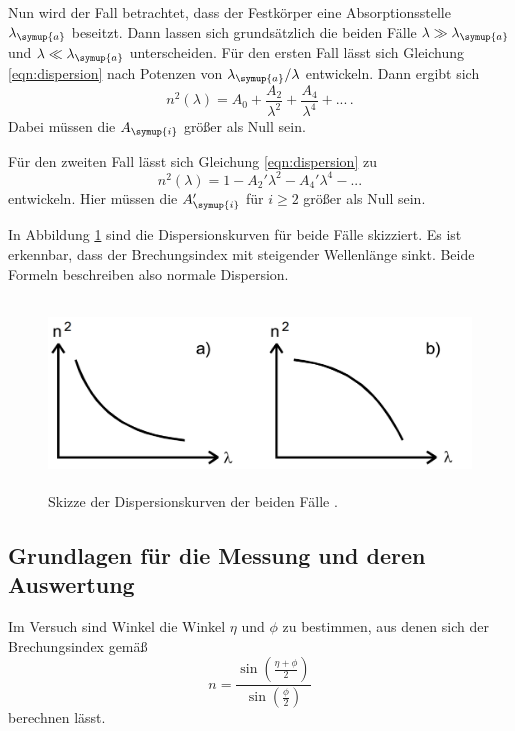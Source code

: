 Nun wird der Fall betrachtet, dass der Festkörper eine Absorptionsstelle
$\lambda_{\symup{a}}$ beseitzt. Dann lassen sich grundsätzlich die beiden Fälle
$\lambda \gg \lambda_{\symup{a}}$ und $\lambda \ll \lambda_{\symup{a}}$ unterscheiden.
Für den ersten Fall lässt sich Gleichung \eqref{eqn:dispersion} nach Potenzen von
$\lambda_{\symup{a}}/\lambda$ entwickeln. Dann ergibt sich
\begin{equation}
  n^2(\lambda)=A_0+\frac{A_2}{\lambda^2}+\frac{A_4}{\lambda^4}+... \,.
  \label{fall1}
\end{equation}
Dabei müssen die $A_{\symup{i}}$ größer als Null sein.

Für den zweiten Fall lässt sich Gleichung \eqref{eqn:dispersion} zu
\begin{equation}
  n^2(\lambda)=1-A_2'\lambda^2-A_4'\lambda^4-...
  \label{fall2}
\end{equation}
entwickeln. Hier müssen die $A_{\symup{i}}'$ für $i≥2$ größer als Null sein.

In Abbildung \ref{fig:faelle} sind die Dispersionskurven für beide Fälle skizziert.
Es ist erkennbar, dass der Brechungsindex mit steigender Wellenlänge sinkt. Beide
Formeln beschreiben also normale Dispersion.

\begin{figure}[H]
  \centering
  \includegraphics[height=5cm]{data/dispersionskurve.png}
  \caption{Skizze der Dispersionskurven der beiden Fälle \cite{Versuchsanleitung}.}
  \label{fig:faelle}
\end{figure}

\subsection{Grundlagen für die Messung und deren Auswertung}
\label{subsec:messung}

Im Versuch sind Winkel die Winkel $\eta$ und $\phi$ zu bestimmen, aus denen sich
der Brechungsindex gemäß
\begin{equation}
  n=\frac{\sin\left(\frac{\eta+\phi}{2}\right)}{\sin\left(\frac{\phi}{2}\right)}
  \label{eqn:n_aus_winkeln}
\end{equation}
berechnen lässt.


